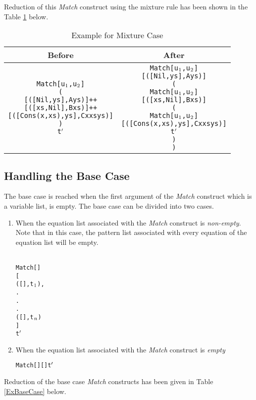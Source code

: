 \documentclass[11pt]{article}
\begin{document}
Reduction of this {\em Match} construct using the mixture rule has been shown in the Table \ref {exMixed} below.

\begin{table}[h!]
\begin{center}
\begin{tabular}{|c|c|} \hline
{\bf Before} & {\bf After} \\ 
\hline
\begin{minipage}{3in}
 \begin{alltt}


    Match [u\(\sb{1}\),u\(\sb{2}\)]
      (
        [([Nil,ys],       A ys)] ++
        [([xs,Nil],       B xs)] ++
        [([Cons(x,xs),ys],C x xs ys)]
      )  
      t\(\sp{\prime}\) 

\end{alltt} 
\end {minipage} &
\begin{minipage}{3.2in}
\begin{alltt}

    Match [u\(\sb{1}\),u\(\sb{2}\)]
      [([Nil,ys],A ys)] 
      (
        Match [u\(\sb{1}\),u\(\sb{2}\)]
          [([xs,Nil],B xs)] 
          (
            Match [u\(\sb{1}\),u\(\sb{2}\)]
              [([Cons(x,xs),ys],C x xs ys)]
              t\(\sp{\prime}\) 
          )
      )  
      
\end{alltt} 
\end {minipage}
\tabularnewline
\hline
\end{tabular}
\caption{Example for Mixture Case}
\label{exMixed}
\end{center}
\end{table}

\subsection {Handling the Base Case} \label{BaseCase}
The base case is reached when the first argument of the {\em Match} construct which is a variable list, is empty. The base case can be divided into two cases.
\begin{enumerate}
    \item When the equation list associated with the {\em Match} construct is {\em non-empty}. Note that in this case, the pattern list associated with every equation of the equation list will be empty.
    ~~\\~~\\
    \begin{alltt}
    Match [] 
         [
          ([],t\(\sb{1}\)),
             .
             .
             .
          ([],t\(\sb{n}\))
         ] 
         t\(\sp{\prime}\) 

    \end{alltt}
    \item When the equation list associated with the {\em Match} construct is {\em empty}
    \begin{alltt}
    Match [] [] t\(\sp{\prime}\) 
    \end{alltt}
\end{enumerate}
Reduction of the base case {\em Match} constructs has been given in Table \ref{ExBaseCase} below.
\end{document}
